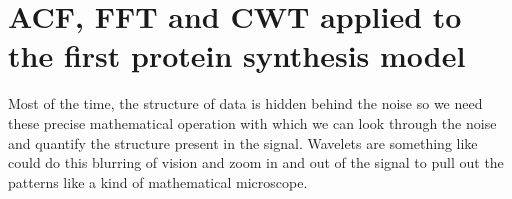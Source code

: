 \documentclass[12pt,a4paper]{report}
\begin{document}





\newpage

\section{ACF, FFT and CWT applied to the first protein synthesis model}

Most of the time, the structure of data is hidden behind the noise so we need these precise mathematical operation with which we can look through the noise and quantify the structure present in the signal. Wavelets are something like could do this blurring of vision and zoom in and out of the signal to pull out the patterns like a kind of mathematical microscope.
\end{document}
